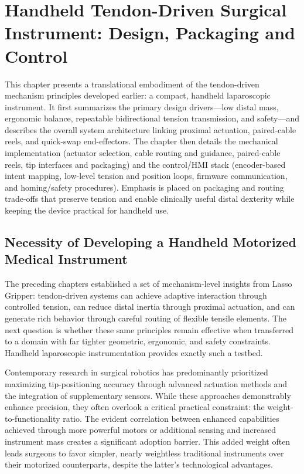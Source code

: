 \chapter{Handheld Tendon-Driven Surgical Instrument: Design, Packaging and Control}

\label{Chapter7}

\begin{chaptersummary}
This chapter presents a translational embodiment of the tendon-driven mechanism principles developed earlier: a compact, handheld laparoscopic instrument. It first summarizes the primary design drivers—low distal mass, ergonomic balance, repeatable bidirectional tension transmission, and safety—and describes the overall system architecture linking proximal actuation, paired-cable reels, and quick-swap end-effectors. The chapter then details the mechanical implementation (actuator selection, cable routing and guidance, paired-cable reels, tip interfaces and packaging) and the control/HMI stack (encoder-based intent mapping, low-level tension and position loops, firmware communication, and homing/safety procedures). Emphasis is placed on packaging and routing trade-offs that preserve tension and enable clinically useful distal dexterity while keeping the device practical for handheld use.
\end{chaptersummary}

\section{Necessity of Developing a Handheld Motorized Medical Instrument}
The preceding chapters established a set of mechanism-level insights from Lasso Gripper: tendon-driven systems can achieve adaptive interaction through controlled tension, can reduce distal inertia through proximal actuation, and can generate rich behavior through careful routing of flexible tensile elements. The next question is whether these same principles remain effective when transferred to a domain with far tighter geometric, ergonomic, and safety constraints. Handheld laparoscopic instrumentation provides exactly such a testbed.

Contemporary research in surgical robotics has predominantly prioritized maximizing tip-positioning accuracy through advanced actuation methods and the integration of supplementary sensors. While these approaches demonstrably enhance precision, they often overlook a critical practical constraint: the weight-to-functionality ratio. The evident correlation between enhanced capabilities achieved through more powerful motors or additional sensing and increased instrument mass creates a significant adoption barrier. This added weight often leads surgeons to favor simpler, nearly weightless traditional instruments over their motorized counterparts, despite the latter's technological advantages.

